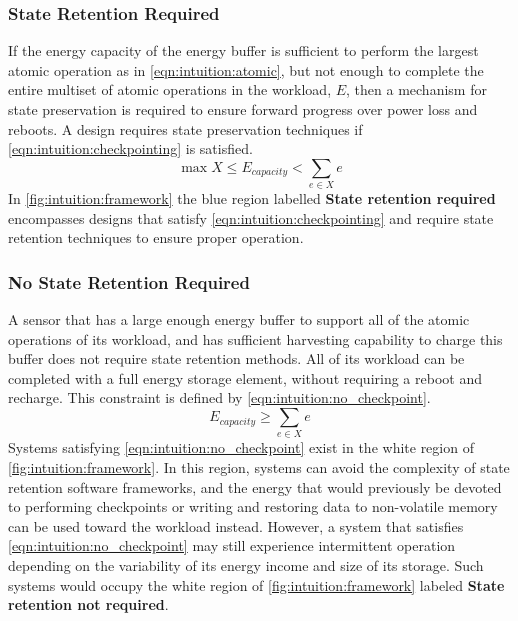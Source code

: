 \subsubsection{State Retention Required}
If the energy capacity of the energy buffer 
is sufficient to perform the largest atomic operation as in \cref{eqn:intuition:atomic}, but
not enough to complete
the entire multiset of atomic operations in the workload, $E$,
then a mechanism for state preservation is required to ensure forward progress over power loss and reboots.
A design requires state preservation techniques if \cref{eqn:intuition:checkpointing} is satisfied.
\begin{equation}
    \label{eqn:intuition:checkpointing}
    \max X \leq E_{capacity} < \sum_{e \in X} e
\end{equation}
In \cref{fig:intuition:framework} the blue region labelled \textbf{State retention required} encompasses designs that satisfy \cref{eqn:intuition:checkpointing} and require state retention techniques to ensure proper operation.  

\subsubsection{No State Retention Required} 
A sensor that has a large enough energy buffer to support all of the atomic operations of its workload, and has sufficient harvesting capability to charge this buffer does not require state retention methods. All of its workload can be completed with a full energy storage element, without requiring a reboot and recharge.
This constraint is defined by \cref{eqn:intuition:no_checkpoint}.
\begin{equation}
    \label{eqn:intuition:no_checkpoint}
    E_{capacity} \geq \sum_{e \in X} e 
\end{equation}
Systems satisfying \cref{eqn:intuition:no_checkpoint} exist in the white region of \cref{fig:intuition:framework}.
In this region, systems can avoid the complexity of state retention software frameworks, and the energy that would previously be devoted to performing checkpoints or writing and restoring data to non-volatile memory can be used toward the workload instead. 
However, a system that satisfies \cref{eqn:intuition:no_checkpoint} may still experience intermittent operation depending on the variability of its energy income and size of its storage. Such systems would occupy the white region of \cref{fig:intuition:framework} labeled \textbf{State retention not required}.

